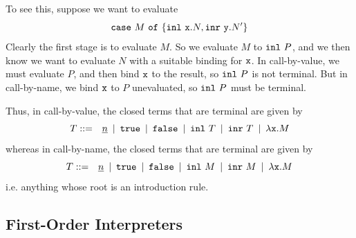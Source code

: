 \documentclass[runningheads,12pt]{llncs}
\begin{document}
To see this, suppose we want to evaluate 
\begin{displaymath}
\mathtt{case} \  M \ \mathtt{of}\  \{ \mathtt{inl} \  {\mathtt{x}}.N, \mathtt{inr} \  {\mathtt{y}}. N'\}
\end{displaymath}
Clearly the first stage is to evaluate $M$.   So we evaluate $M$ to $\mathtt{inl} \  {P}$, and we then know we want to evaluate $N$ with a suitable binding for $\mathtt{x}$.  In call-by-value, we must evaluate $P$, and then bind $\mathtt{x}$ to the result, so $\mathtt{inl} \  {P}$ is not terminal.  But in call-by-name, we bind $\mathtt{x}$ to $P$ unevaluated, so $\mathtt{inl} \  {P}$ must be terminal.

Thus, in call-by-value, the closed terms that are terminal are given by
\begin{displaymath}
  T ::=\hspace{0.7em} \underline{n} \hspace{0.5em} | \hspace{0.5em} \mathtt{true} \hspace{0.5em} | \hspace{0.5em} \mathtt{false} \hspace{0.5em} | \hspace{0.5em} \mathtt{inl} \  {T} \hspace{0.5em} | \hspace{0.5em} \mathtt{inr} \  {T} \hspace{0.5em} | \hspace{0.5em} \lambda \mathtt{x}. M 
\end{displaymath}
whereas in call-by-name, the closed terms that are terminal are given by
\begin{displaymath}
  T ::=\hspace{0.7em} \underline{n} \hspace{0.5em} | \hspace{0.5em} \mathtt{true} \hspace{0.5em} | \hspace{0.5em} \mathtt{false} \hspace{0.5em} | \hspace{0.5em} \mathtt{inl} \  {M} \hspace{0.5em} | \hspace{0.5em} \mathtt{inr} \  {M} \hspace{0.5em} | \hspace{0.5em} \lambda \mathtt{x}. M
\end{displaymath}
i.e. anything whose root is an introduction rule.  

\subsection{First-Order Interpreters}
\end{document}
